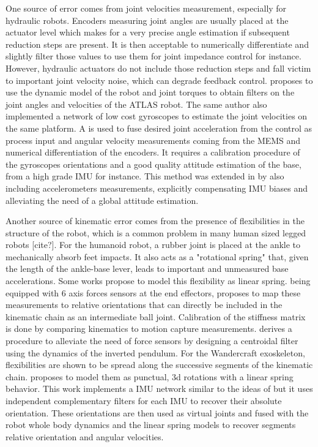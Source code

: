 One source of error comes from joint velocities measurement, especially for hydraulic robots. Encoders measuring joint angles are usually placed 
at the actuator level which makes for a very precise angle estimation if subsequent reduction steps are present. It is then acceptable to numerically 
differentiate and slightly filter those values to use them for joint impedance control for instance. However, hydraulic
actuators do not include those reduction steps and fall victim to important joint velocity noise, which can degrade feedback control.
\cite{xinjilefu2014decoupled} proposes to use the dynamic model of the robot and joint torques to obtain filters on the joint angles and velocities
of the ATLAS robot. The same author \cite{xinjilefu2016distributed} also implemented a network of low cost gyroscopes to estimate the joint velocities 
on the same platform. A \KalmanF is used to fuse desired joint acceleration from the control as process input and angular velocity measurements coming from 
the MEMS and numerical differentiation of the encoders. It requires a calibration procedure of the gyroscopes orientations and a good quality attitude
estimation of the base, from a high grade IMU for instance. This method was extended in \cite{rotella2016imu} by also including
accelerometers measurements, explicitly compensating IMU biases and alleviating the need of a global attitude estimation.

Another source of kinematic error comes from the presence of flexibilities in the structure of the robot, which is a common problem in many human sized legged robots [cite?]. 
For the  humanoid robot, a rubber joint is placed at the ankle to mechanically absorb feet impacts. 
It also acts as a "rotational spring" that, given the length of the ankle-base lever, 
leads to important and unmeasured base accelerations. Some works propose to model this flexibility as linear spring.  being equipped with 6 axis 
forces sensors at the end effectors, \cite{flayols2017experimental} proposes to map these measurements to relative orientations that can 
directly be included in the kinematic chain as an intermediate ball joint. Calibration of the stiffness matrix is done by comparing 
kinematics to motion capture measurements. \cite{benallegue2015estimation} derives a procedure to alleviate the need of force sensors by 
designing a centroidal filter using the dynamics of the inverted pendulum. For the Wandercraft exoskeleton, flexibilities
are shown to be spread along the successive segments of the kinematic chain. \cite{vigne2018estimation} proposes to model them as punctual, 
3d rotations with a linear spring behavior. This work implements a IMU network similar to the ideas of \cite{xinjilefu2016distributed,rotella2016imu} 
but it uses independent complementary filters for each IMU to recover their absolute orientation. These orientations are then used as 
virtual joints and fused with the robot whole body dynamics and the linear spring models to recover segments relative orientation and angular velocities.

